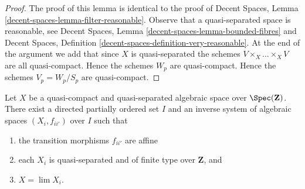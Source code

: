 \begin{proof}
The proof of this lemma is identical to the proof of
Decent Spaces, Lemma \ref{decent-spaces-lemma-filter-reasonable}.
Observe that a quasi-separated space is reasonable, see
Decent Spaces, Lemma \ref{decent-spaces-lemma-bounded-fibres} and
Decent Spaces, Definition \ref{decent-spaces-definition-very-reasonable}.
At the end of the argument we add that since $X$ is quasi-separated
the schemes $V \times_X \ldots \times_X V$ are all quasi-compact.
Hence the schemes $W_p$ are quasi-compact. Hence the schemes
$V_p = W_p/S_p$ are quasi-compact.
\end{proof}

\begin{proposition}
\label{proposition-approximate}
Let $X$ be a quasi-compact and quasi-separated algebraic space over
$\Spec(\mathbf{Z})$. There exist a directed partially ordered set $I$
and an inverse system of algebraic spaces $(X_i, f_{ii'})$ over $I$
such that
\begin{enumerate}
\item the transition morphisms $f_{ii'}$ are affine
\item each $X_i$ is quasi-separated and of finite type over
$\mathbf{Z}$, and
\item $X = \lim X_i$.
\end{enumerate}
\end{proposition}

